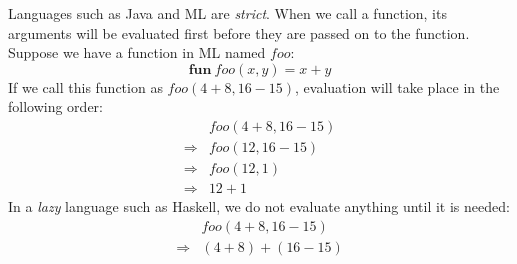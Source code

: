 \question Languages such as Java and ML are \emph{strict}. When we call a function, its arguments will be evaluated first before they are passed on to the function. Suppose we have a function in ML named $\mathit{foo}$:
\begin{displaymath}
\mathbf{fun}~\mathit{foo}(x,y) = x + y
\end{displaymath}
If we call this function as $\mathit{foo}(4+8,16-15)$, evaluation will take place in the following order:
\begin{displaymath}
\begin{array}{cl}
 & \mathit{foo}(4+8,16-15) \\
\Rightarrow & \mathit{foo}(12,16-15) \\
\Rightarrow & \mathit{foo}(12,1) \\
\Rightarrow & 12 + 1
\end{array}
\end{displaymath}
In a \emph{lazy} language such as Haskell, we do not evaluate anything until it is needed:
\begin{displaymath}
\begin{array}{cl}
 & \mathit{foo}(4+8,16-15) \\
\Rightarrow & (4+8) + (16-15)
\end{array}
\end{displaymath}